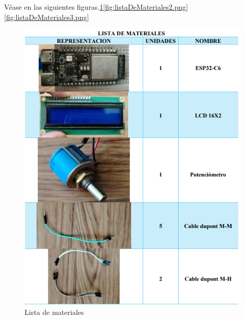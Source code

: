     Véase en las siguientes figuras.\ref{fig:listaDeMateriales1.png}\ref{fig:listaDeMateriales2.png}\ref{fig:listaDeMateriales3.png}
    \begin{figure}[H]
        \centering
        \includegraphics[trim = {0mm 0mm 0mm 0mm},clip,scale=0.5]{12/Img/listaDeMateriales1.png}
        \caption{Lista de materiales}
        \label{fig:listaDeMateriales1.png}
    \end{figure}
    
